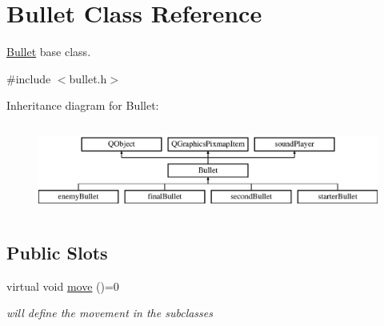 \hypertarget{classBullet}{}\section{Bullet Class Reference}
\label{classBullet}


\hyperlink{classBullet}{Bullet} base class.  




{\ttfamily \#include $<$bullet.\+h$>$}

Inheritance diagram for Bullet\+:\begin{figure}[H]
\begin{center}
\leavevmode
\includegraphics[height=2.937063cm]{classBullet}
\end{center}
\end{figure}
\subsection*{Public Slots}
\begin{DoxyCompactItemize}
\item 
\mbox{\label{classBullet_aaeafe4ef62aa04e13e93203a7a9066eb}} 
virtual void \hyperlink{classBullet_aaeafe4ef62aa04e13e93203a7a9066eb}{move} ()=0
\begin{DoxyCompactList}\small\item\em will define the movement in the subclasses \end{DoxyCompactList}\end{DoxyCompactItemize}
